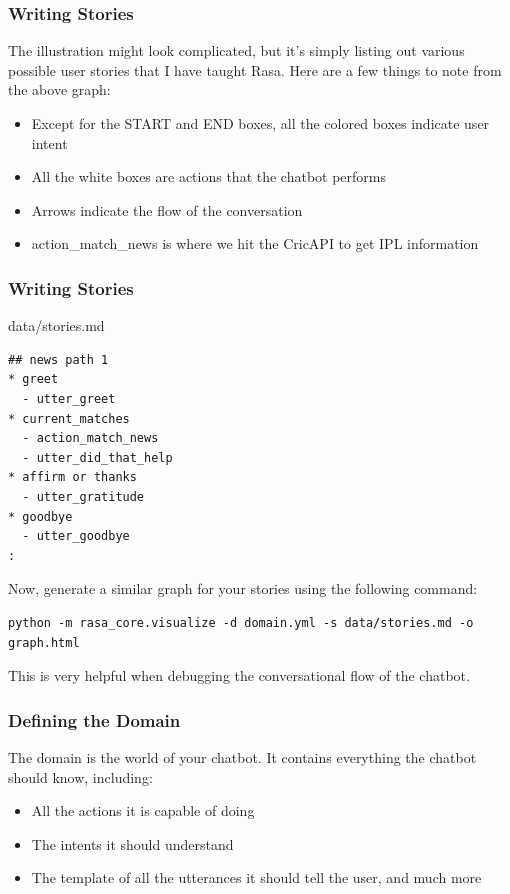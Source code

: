 \begin{frame}[fragile]\frametitle{Writing Stories}

 The illustration might look complicated, but it's simply listing out various possible user stories that I have taught Rasa. Here are a few things to note from the above graph:
 
 
\begin{itemize}
\item Except for the START and END boxes, all the colored boxes indicate user intent
\item All the white boxes are actions that the chatbot performs
\item  Arrows indicate the flow of the conversation
\item  action\_match\_news is where we hit the CricAPI to get IPL information
\end{itemize}
\end{frame}


\begin{frame}[fragile]\frametitle{Writing Stories}

data/stories.md

\begin{lstlisting}
## news path 1
* greet
  - utter_greet
* current_matches
  - action_match_news
  - utter_did_that_help
* affirm or thanks
  - utter_gratitude
* goodbye
  - utter_goodbye
:
\end{lstlisting}

Now, generate a similar graph for your stories using the following command:

\begin{lstlisting}
python -m rasa_core.visualize -d domain.yml -s data/stories.md -o graph.html
\end{lstlisting}

This is very helpful when debugging the conversational flow of the chatbot.

\end{frame}

 \begin{frame}[fragile]\frametitle{Defining the Domain}

The domain is the world of your chatbot. It contains everything the chatbot should know, including:
 
 
\begin{itemize}
\item All the actions it is capable of doing
\item The intents it should understand
\item The template of all the utterances it should tell the user, and much more
\end{itemize}
\end{frame}

